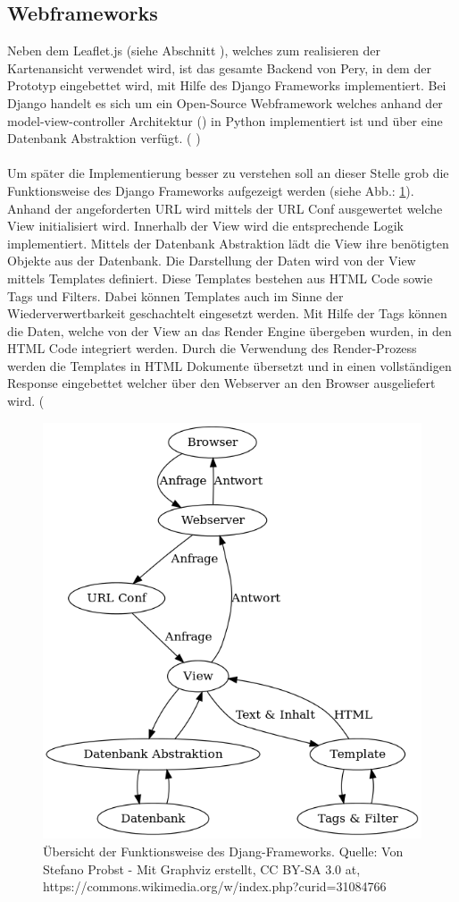\documentclass[Bachelorarbeit.tex]{subfiles}
\begin{document}
\subsection*{Webframeworks}
Neben dem Leaflet.js (siehe Abschnitt ), welches zum realisieren der Kartenansicht verwendet wird, ist das gesamte Backend von Pery, in dem der Prototyp eingebettet wird, mit Hilfe des Django Frameworks implementiert. 
Bei Django handelt es sich um ein Open-Source Webframework welches anhand der model-view-controller Architektur (\cite[vgl.][]{DjangoMVC}) in Python implementiert ist und über eine Datenbank Abstraktion verfügt. (\cite[vgl.][]{DjangoDoc} \cite[sowie][- sekundär Quelle]{DjangoStackoverflow})\\
\\
Um später die Implementierung besser zu verstehen soll an dieser Stelle grob die Funktionsweise des Django Frameworks aufgezeigt werden (siehe Abb.: \ref{fig:MTV_Django}).
Anhand der angeforderten \ac{URL} wird mittels der \ac{URL Conf} ausgewertet welche View initialisiert wird.
Innerhalb der View wird die entsprechende Logik implementiert.
Mittels der Datenbank Abstraktion lädt die View ihre benötigten Objekte aus der Datenbank.
Die Darstellung der Daten wird von der View mittels Templates definiert. 
Diese Templates bestehen aus \ac{HTML} Code sowie Tags und Filters. 
Dabei können Templates auch im Sinne der Wiederverwertbarkeit geschachtelt eingesetzt werden. 
Mit Hilfe der Tags können die Daten, welche von der View an das Render Engine übergeben wurden, in den \ac{HTML} Code integriert werden.
Durch die Verwendung des Render-Prozess werden die Templates in \ac{HTML} Dokumente übersetzt und in einen vollständigen Response eingebettet welcher über den Webserver an den Browser ausgeliefert wird. (\cite[vgl.][]{DjangoDoc}

\begin{figure}[H]
\centering
\includegraphics[width=0.7\linewidth]{img/Implementierung/MTV_Django}
\caption[k]{Übersicht der Funktionsweise des Djang-Frameworks. Quelle: Von Stefano Probst - Mit Graphviz erstellt, CC BY-SA 3.0 at, https://commons.wikimedia.org/w/index.php?curid=31084766}
\label{fig:MTV_Django}
\end{figure}
\end{document}
